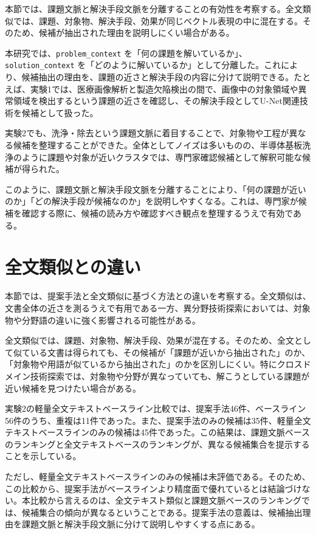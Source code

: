 本節では、課題文脈と解決手段文脈を分離することの有効性を考察する。全文類似では、課題、対象物、解決手段、効果が同じベクトル表現の中に混在する。そのため、候補が抽出された理由を説明しにくい場合がある。

本研究では、\texttt{problem\_context} を「何の課題を解いているか」、\texttt{solution\_context} を「どのように解いているか」として分離した。これにより、候補抽出の理由を、課題の近さと解決手段の内容に分けて説明できる。たとえば、実験1では、医療画像解析と製造欠陥検出の間で、画像中の対象領域や異常領域を検出するという課題の近さを確認し、その解決手段としてU-Net関連技術を候補として扱った。

実験2でも、洗浄・除去という課題文脈に着目することで、対象物や工程が異なる候補を整理することができた。全体としてノイズは多いものの、半導体基板洗浄のように課題や対象が近いクラスタでは、専門家確認候補として解釈可能な候補が得られた。

このように、課題文脈と解決手段文脈を分離することにより、「何の課題が近いのか」「どの解決手段が候補なのか」を説明しやすくなる。これは、専門家が候補を確認する際に、候補の読み方や確認すべき観点を整理するうえで有効である。

\section{全文類似との違い}

本節では、提案手法と全文類似に基づく方法との違いを考察する。全文類似は、文書全体の近さを測るうえで有用である一方、異分野技術探索においては、対象物や分野語の違いに強く影響される可能性がある。

全文類似では、課題、対象物、解決手段、効果が混在する。そのため、全文として似ている文書は得られても、その候補が「課題が近いから抽出された」のか、「対象物や用語が似ているから抽出された」のかを区別しにくい。特にクロスドメイン技術探索では、対象物や分野が異なっていても、解こうとしている課題が近い候補を見つけたい場合がある。

実験2の軽量全文テキストベースライン比較では、提案手法46件、ベースライン56件のうち、重複は11件であった。また、提案手法のみの候補は35件、軽量全文テキストベースラインのみの候補は45件であった。この結果は、課題文脈ベースのランキングと全文テキストベースのランキングが、異なる候補集合を提示することを示している。

ただし、軽量全文テキストベースラインのみの候補は未評価である。そのため、この比較から、提案手法がベースラインより精度面で優れているとは結論づけない。本比較から言えるのは、全文テキスト類似と課題文脈ベースのランキングでは、候補集合の傾向が異なるということである。提案手法の意義は、候補抽出理由を課題文脈と解決手段文脈に分けて説明しやすくする点にある。

